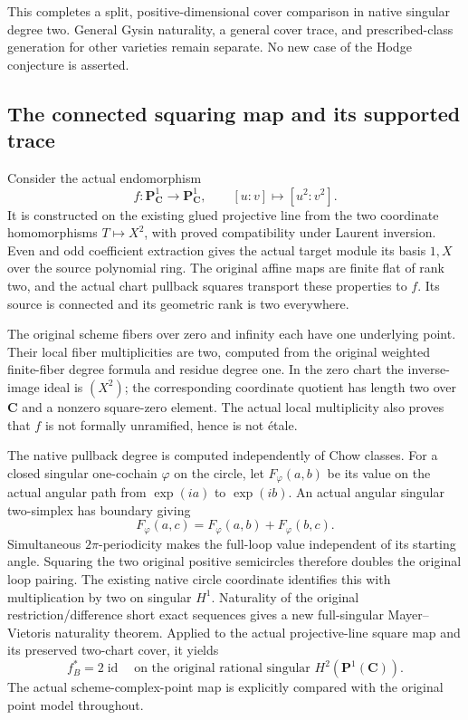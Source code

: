 \documentclass[11pt]{article}
\theoremstyle{definition}
\theoremstyle{remark}
\begin{document}
This completes a split, positive-dimensional cover comparison in native
singular degree two. General Gysin naturality, a general cover trace,
and prescribed-class generation for other varieties remain separate.
No new case of the Hodge conjecture is asserted.

\subsection{The connected squaring map and its supported trace}
\label{subsec:p1-square-cover}

Consider the actual endomorphism
\[
 f:\mathbf P^1_{\mathbf C}\longrightarrow\mathbf P^1_{\mathbf C},
 \qquad [u:v]\longmapsto[u^2:v^2].
\]
It is constructed on the existing glued projective line from the two
coordinate homomorphisms \(T\mapsto X^2\), with proved compatibility
under Laurent inversion. Even and odd coefficient extraction gives the
actual target module its basis \(1,X\) over the source polynomial ring.
The original affine maps are finite flat of rank two, and the actual
chart pullback squares transport these properties to \(f\). Its source
is connected and its geometric rank is two everywhere.

The original scheme fibers over zero and infinity each have one underlying
point. Their local fiber multiplicities are two, computed from the
original weighted finite-fiber degree formula and residue degree one.
In the zero chart the inverse-image ideal is \((X^2)\); the corresponding
coordinate quotient has length two over \(\mathbf C\) and a nonzero square-zero element.
The actual local multiplicity also proves that \(f\) is not formally
unramified, hence is not \'{e}tale.

The native pullback degree is computed independently of Chow classes.
For a closed singular one-cochain \(\varphi\) on the circle, let
\(F_\varphi(a,b)\) be its value on the actual angular path from
\(\exp(ia)\) to \(\exp(ib)\). An actual angular singular two-simplex
has boundary giving
\[
 F_\varphi(a,c)=F_\varphi(a,b)+F_\varphi(b,c).
\]
Simultaneous \(2\pi\)-periodicity makes the full-loop value independent
of its starting angle. Squaring the two original positive semicircles
therefore doubles the original loop pairing. The existing native circle
coordinate identifies this with multiplication by two on singular
\(H^1\). Naturality of the original restriction/difference short exact
sequences gives a new full-singular Mayer--Vietoris naturality theorem.
Applied to the actual projective-line square map and its preserved
two-chart cover, it yields
\[
 f_B^*=2\operatorname{id}
 \quad\text{on the original rational singular }H^2(\mathbf P^1(\mathbf C)).
\]
The actual scheme-complex-point map is explicitly compared with the
original point model throughout.
\end{document}
